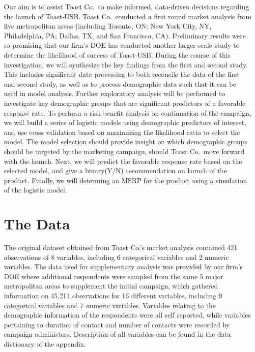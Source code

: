 \documentclass[]{article}
\begin{document}
Our aim is to assist Toast Co.~to make informed, data-driven decisions
regarding the launch of Toast-USB. Toast Co.~conducted a first round
market analysis from five metropolitan areas (including Toronto, ON; New
York City, NY, Philadelphia, PA; Dallas, TX, and San Francisco, CA).
Preliminary results were so promising that our firm's DOE has conducted
another larger-scale study to determine the likelihood of success of
Toast-USB. During the course of this investigation, we will synthesize
the key findings from the first and second study. This includes
significant data processing to both reconcile the data of the first and
second study, as well as to process demographic data such that it can be
used in model analysis. Further exploratory analysis will be performed
to investigate key demographic groups that are significant predictors of
a favorable response rate. To perform a risk-benefit analysis on
continuation of the campaign, we will build a series of logistic models
using demographic predictors of interest, and use cross validation based
on maximizing the likelihood ratio to select the model. The model
selection should provide insight on which demographic groups should be
targeted by the marketing campaign, should Toast Co.~move forward with
the launch. Next, we will predict the favorable response rate based on
the selected model, and give a binary(Y/N) recommendation on launch of
the product. Finally, we will determing an MSRP for the product using a
simulation of the logistic model.

\hypertarget{the-data}{%
\section{The Data}\label{the-data}}

The original dataset obtained from Toast Co.'s market analysis contained
421 observations of 8 variables, including 6 categorical variables and 2
numeric variables. The data used for supplementary analysis was provided
by our firm's DOE where additional respondents were sampled from the
same 5 major metropolitan areas to supplement the initial campaign,
which gathered information on 45,211 observations for 16 different
variables, including 9 categorical variables and 7 numeric variables.
Variables relating to the demographic information of the respondents
were all self reported, while variables pertaining to duration of
contact and number of contacts were recorded by campaign administers.
Description of all variables can be found in the data dictionary of the
appendix.
\end{document}

